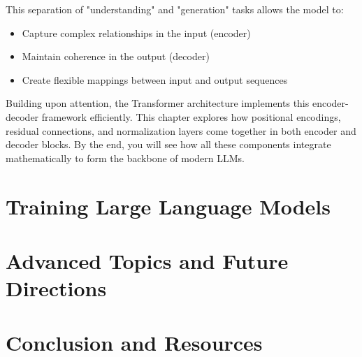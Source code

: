 \documentclass[12pt]{book}
\begin{document}
\noindent
This separation of "understanding" and "generation" tasks allows the model to:
\begin{itemize}
    \item Capture complex relationships in the input (encoder)
    \item Maintain coherence in the output (decoder)
    \item Create flexible mappings between input and output sequences
\end{itemize}

\noindent
Building upon attention, the Transformer architecture implements this encoder-decoder framework efficiently. This chapter explores how positional encodings, residual connections, and normalization layers come together in both encoder and decoder blocks. By the end, you will see how all these components integrate mathematically to form the backbone of modern LLMs.





\part{Training Large Language Models}




\part{Advanced Topics and Future Directions}







\part{Conclusion and Resources}


\printbibliography
\printindex
\end{document}

